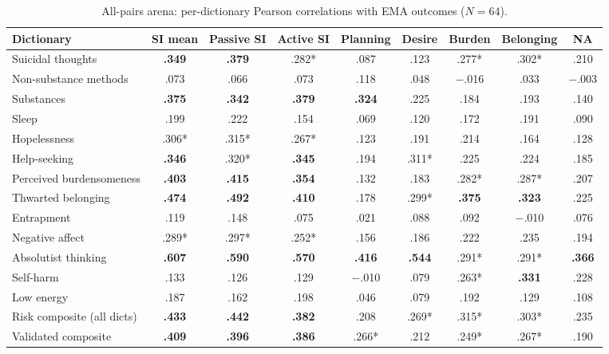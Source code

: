\documentclass[review,12pt,authoryear]{elsarticle}
\begin{document}
\begin{table}[H]
\centering
\footnotesize
\caption{All-pairs arena: per-dictionary Pearson correlations with EMA outcomes ($N = 64$).}
\label{tab:supp_s2_arena}
\setlength{\tabcolsep}{4pt}
\begin{tabular}{@{}lcccccccc@{}}
\toprule
Dictionary & SI mean & Passive SI & Active SI & Planning & Desire & Burden & Belonging & NA \\
\midrule
Suicidal thoughts & \textbf{.349} & \textbf{.379} & .282* & .087 & .123 & .277* & .302* & .210 \\
Non-substance methods & .073 & .066 & .073 & .118 & .048 & $-$.016 & .033 & $-$.003 \\
Substances & \textbf{.375} & \textbf{.342} & \textbf{.379} & \textbf{.324} & .225 & .184 & .193 & .140 \\
Sleep & .199 & .222 & .154 & .069 & .120 & .172 & .191 & .090 \\
Hopelessness & .306* & .315* & .267* & .123 & .191 & .214 & .164 & .128 \\
Help-seeking & \textbf{.346} & .320* & \textbf{.345} & .194 & .311* & .225 & .224 & .185 \\
Perceived burdensomeness & \textbf{.403} & \textbf{.415} & \textbf{.354} & .132 & .183 & .282* & .287* & .207 \\
Thwarted belonging & \textbf{.474} & \textbf{.492} & \textbf{.410} & .178 & .299* & \textbf{.375} & \textbf{.323} & .225 \\
Entrapment & .119 & .148 & .075 & .021 & .088 & .092 & $-$.010 & .076 \\
Negative affect & .289* & .297* & .252* & .156 & .186 & .222 & .235 & .194 \\
Absolutist thinking & \textbf{.607} & \textbf{.590} & \textbf{.570} & \textbf{.416} & \textbf{.544} & .291* & .291* & \textbf{.366} \\
Self-harm & .133 & .126 & .129 & $-$.010 & .079 & .263* & \textbf{.331} & .228 \\
Low energy & .187 & .162 & .198 & .046 & .079 & .192 & .129 & .108 \\
\midrule
Risk composite (all dicts) & \textbf{.433} & \textbf{.442} & \textbf{.382} & .208 & .269* & .315* & .303* & .235 \\
Validated composite & \textbf{.409} & \textbf{.396} & \textbf{.386} & .266* & .212 & .249* & .267* & .190 \\
\bottomrule
\end{tabular}
\end{table}
\end{document}
